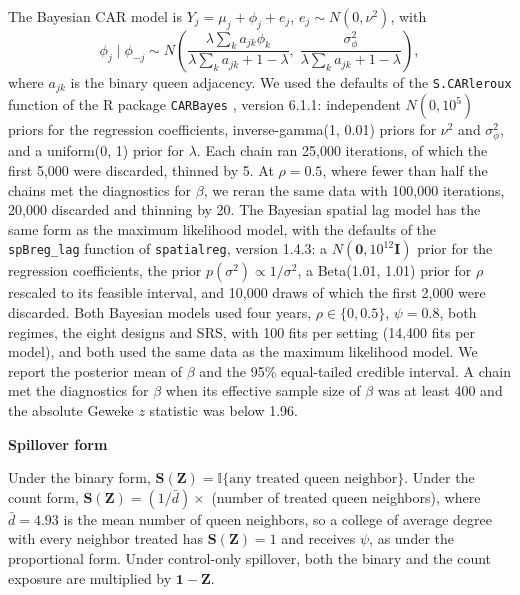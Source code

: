 \documentclass[11pt]{article}
\newcommand{\sihead}[1]{\par\medskip\noindent\textbf{#1}\par\nopagebreak\noindent\ignorespaces}
\begin{document}
The Bayesian CAR model \citep{leroux_estimation_2000} is $Y_j = \mu_j + \phi_j + e_j$, $e_j \sim N(0, \nu^2)$, with
\begin{equation*}
\phi_j \mid \phi_{-j} \sim N\left(\frac{\lambda \sum_k a_{jk}\phi_k}{\lambda \sum_k a_{jk} + 1 - \lambda},\; \frac{\sigma_\phi^2}{\lambda \sum_k a_{jk} + 1 - \lambda}\right),
\end{equation*}
where $a_{jk}$ is the binary queen adjacency. We used the defaults of the \texttt{S.CARleroux} function of the R package \texttt{CARBayes} \citep{lee_carbayes_2013}, version 6.1.1: independent $N(0, 10^5)$ priors for the regression coefficients, inverse-gamma(1, 0.01) priors for $\nu^2$ and $\sigma_\phi^2$, and a uniform(0, 1) prior for $\lambda$. Each chain ran 25,000 iterations, of which the first 5,000 were discarded, thinned by 5. At $\rho = 0.5$, where fewer than half the chains met the diagnostics for $\beta$, we reran the same data with 100,000 iterations, 20,000 discarded and thinning by 20. The Bayesian spatial lag model \citep{lesage_introduction_2009} has the same form as the maximum likelihood model, with the defaults of the \texttt{spBreg\_lag} function of \texttt{spatialreg}, version 1.4.3: a $N(\mathbf{0}, 10^{12} \mathbf{I})$ prior for the regression coefficients, the prior $p(\sigma^2) \propto 1/\sigma^2$, a Beta(1.01, 1.01) prior for $\rho$ rescaled to its feasible interval, and 10,000 draws of which the first 2,000 were discarded. Both Bayesian models used four years, $\rho \in \{0, 0.5\}$, $\psi = 0.8$, both regimes, the eight designs and SRS, with 100 fits per setting (14,400 fits per model), and both used the same data as the maximum likelihood model. We report the posterior mean of $\beta$ and the 95\% equal-tailed credible interval. A chain met the diagnostics for $\beta$ when its effective sample size of $\beta$ was at least 400 and the absolute Geweke $z$ statistic \citep{geweke_evaluating_1992} was below 1.96.

\sihead{Spillover form}
Under the binary form, $\mathbf{S}(\mathbf{Z}) = \mathbb{I}\{\text{any treated queen neighbor}\}$. Under the count form, $\mathbf{S}(\mathbf{Z}) = (1/\bar d) \times$ (number of treated queen neighbors), where $\bar d = 4.93$ is the mean number of queen neighbors, so a college of average degree with every neighbor treated has $\mathbf{S}(\mathbf{Z}) = 1$ and receives $\psi$, as under the proportional form. Under control-only spillover, both the binary and the count exposure are multiplied by $\mathbf{1}-\mathbf{Z}$.

\FloatBarrier
\FloatBarrier
\end{document}
